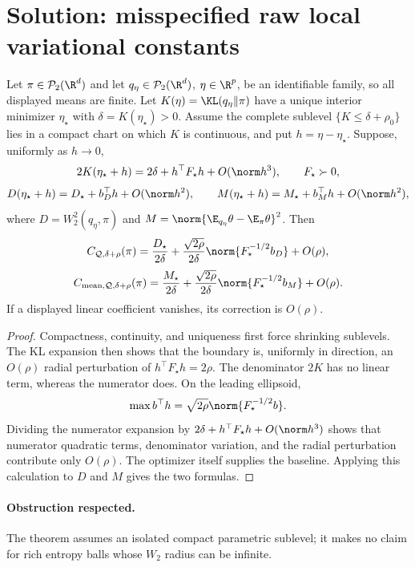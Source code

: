 \documentclass[../main.tex]{subfiles}
\begin{document}

\section*{Solution: misspecified raw local variational constants}

\begin{theorem}
Let $\pi\in\mathcal P_2(\R^d)$ and let $q_\eta\in\mathcal P_2(\R^d)$, $\eta\in\R^p$, be an
identifiable family, so all displayed means are finite. Let
$K(\eta)=\KL(q_\eta\|\pi)$ have a unique interior minimizer $\eta_\star$ with
$\delta=K(\eta_\star)>0$. Assume the complete sublevel
$\{K\le\delta+\rho_0\}$ lies in a compact chart on which $K$ is continuous, and put
$h=\eta-\eta_\star$. Suppose, uniformly as $h\to0$,
\[
 2K(\eta_\star+h)=2\delta+h^\top F_\star h+O(\norm h^3),\qquad F_\star\succ0,
\]
\[
 D(\eta_\star+h)=D_\star+b_D^\top h+O(\norm h^2),\qquad
 M(\eta_\star+h)=M_\star+b_M^\top h+O(\norm h^2),
\]
where $D=W_2^2(q_\eta,\pi)$ and
$M=\norm{\E_{q_\eta}\theta-\E_\pi\theta}^2$. Then
\[
 C_{\mathcal Q,\delta+\rho}(\pi)
 =\frac{D_\star}{2\delta}
 +\frac{\sqrt{2\rho}}{2\delta}\norm{F_\star^{-1/2}b_D}+O(\rho),
\]
\[
 C_{\mathrm{mean},\mathcal Q,\delta+\rho}(\pi)
 =\frac{M_\star}{2\delta}
 +\frac{\sqrt{2\rho}}{2\delta}\norm{F_\star^{-1/2}b_M}+O(\rho).
\]
If a displayed linear coefficient vanishes, its correction is $O(\rho)$.
\end{theorem}

\begin{proof}
Compactness, continuity, and uniqueness first force shrinking sublevels. The KL expansion then
shows that the boundary is, uniformly in direction, an $O(\rho)$ radial perturbation of
$h^\top F_\star h=2\rho$. The denominator $2K$ has no linear term, whereas the numerator does.
On the leading ellipsoid,
\[
 \max b^\top h=\sqrt{2\rho}\norm{F_\star^{-1/2}b}.
\]
Dividing the numerator expansion by
$2\delta+h^\top F_\star h+O(\norm h^3)$ shows that numerator quadratic terms, denominator
variation, and the radial perturbation contribute only $O(\rho)$. The optimizer itself supplies
the baseline. Applying this calculation to $D$ and $M$ gives the two formulas.
\end{proof}

\paragraph{Obstruction respected.}
The theorem assumes an isolated compact parametric sublevel; it makes no claim for rich entropy
balls whose $W_2$ radius can be infinite.
\end{document}
